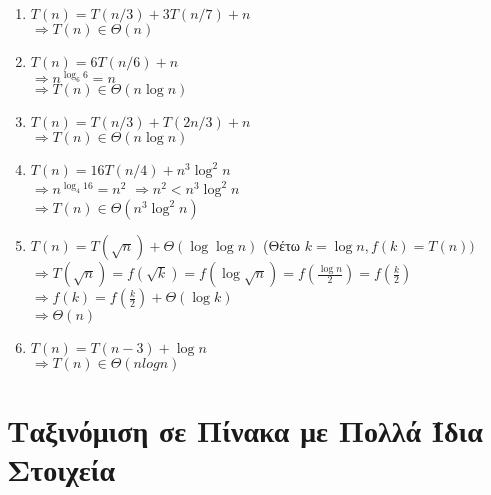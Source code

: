 \documentclass[a4paper,10pt]{article} \usepackage{anysize}
\newcommand{\tab}{\hspace*{3em}}
\begin{document}
\begin{enumerate}
\begin{enumerate}
\item $T(n) = T(n/3) +3T(n/7)+n$\\
$\Rightarrow T(n) \in \Theta(n)$

\item $T(n) = 6T(n/6)+n$\\
$\Rightarrow n^{\log _6 {6}} = n$\\
$\Rightarrow T(n) \in \Theta(n\log {n})$

\item $T(n) = T(n/3) + T(2n/3) + n$\\
$\Rightarrow T(n) \in \Theta(n\log{n})$

\item $T(n) = 16T(n/4) + n^3\log^2{n}$\\
$\Rightarrow n^{\log _4{16}} = n^2$
$\Rightarrow n^2 < n^3\log^2{n}$\\
$\Rightarrow T(n) \in \Theta(n^3\log^2{n})$

\item $T(n) = T(\sqrt{n}) + \Theta(\log{\log{n}})$ \tab
(Θέτω $k=\log{n}, f(k)=T(n))$\\
$\Rightarrow
T(\sqrt{n})=f(\sqrt{k})=f(\log{\sqrt{n}})=f(\frac{\log{n}}{2})=f(\frac{k}{2}) $\\
$\Rightarrow f(k)=f(\frac{k}{2})+\Theta(\log{k})$\\
$\Rightarrow \Theta(n)$

\item $T(n) = T(n-3) + \log{n}$\\
$\Rightarrow T(n) \in \Theta(nlogn)$

\end{enumerate}
\end{enumerate}

\section{Ταξινόμιση σε Πίνακα με Πολλά Ίδια Στοιχεία}


\pagebreak
\end{document}
